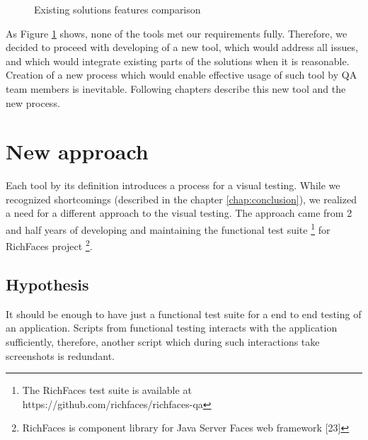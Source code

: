 \documentclass[11pt,oneside,final]{fithesis2}
\begin{document}
  \begin{figure}[!htb]
    \begin{center}
    \leavevmode
    \centerline{}
    \end{center}
    \caption{Existing solutions features comparison}
    \label{fig:existingSolutionComparison} 
  \end{figure}
  
  As Figure \ref{fig:existingSolutionComparison} shows, none of the tools met our requirements fully. Therefore, we decided to proceed with developing of a new tool, which would address
  all issues, and which would integrate existing parts of the solutions when it is reasonable. Creation of a new process which would enable effective usage of such
  tool by QA team members is inevitable. Following chapters describe this new tool and the new process.
  
\chapter{New approach}
  Each tool by its definition introduces a process for a visual testing. While we recognized shortcomings (described in the chapter \ref{chap:conclusion}), we realized a need for a different 
  approach to the visual testing. The approach came from 2 and half years of developing and maintaining the functional test suite \footnote{The RichFaces test suite is available at 
  https://github.com/richfaces/richfaces-qa} for RichFaces project \footnote{RichFaces is component library for Java Server Faces web framework [23]}.
  
  \section{Hypothesis}
  \label{sec:hypothesis}
  It should be enough to have just a functional test suite for a end to end testing of an application. Scripts from functional testing interacts with the application sufficiently, 
  therefore, another script which during such interactions take screenshots is redundant.
  
\end{document}
